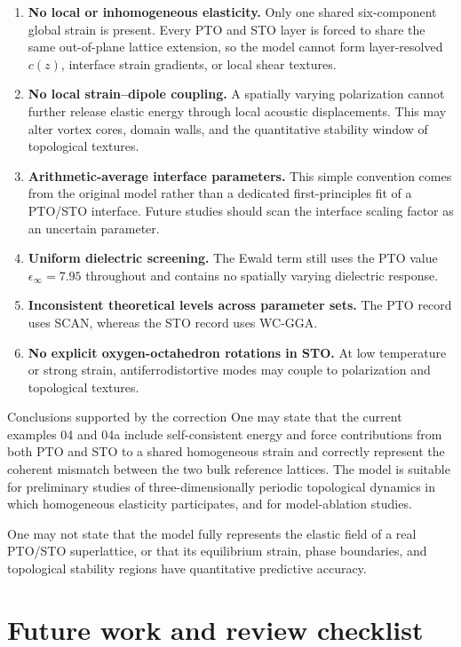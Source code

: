 \documentclass[11pt,a4paper]{article}
\begin{document}
\begin{enumerate}
  \item \textbf{No local or inhomogeneous elasticity.} Only one shared six-component global strain is present. Every PTO and STO layer is forced to share the same out-of-plane lattice extension, so the model cannot form layer-resolved $c(z)$, interface strain gradients, or local shear textures.
  \item \textbf{No local strain--dipole coupling.} A spatially varying polarization cannot further release elastic energy through local acoustic displacements. This may alter vortex cores, domain walls, and the quantitative stability window of topological textures.
  \item \textbf{Arithmetic-average interface parameters.} This simple convention comes from the original model rather than a dedicated first-principles fit of a PTO/STO interface. Future studies should scan the interface scaling factor as an uncertain parameter.
  \item \textbf{Uniform dielectric screening.} The Ewald term still uses the PTO value $\epsilon_\infty=7.95$ throughout and contains no spatially varying dielectric response.
  \item \textbf{Inconsistent theoretical levels across parameter sets.} The PTO record uses SCAN, whereas the STO record uses WC-GGA.
  \item \textbf{No explicit oxygen-octahedron rotations in STO.} At low temperature or strong strain, antiferrodistortive modes may couple to polarization and topological textures.
\end{enumerate}

\begin{resultbox}{Conclusions supported by the correction}
One may state that the current examples 04 and 04a include self-consistent energy and force contributions from both PTO and STO to a shared homogeneous strain and correctly represent the coherent mismatch between the two bulk reference lattices. The model is suitable for preliminary studies of three-dimensionally periodic topological dynamics in which homogeneous elasticity participates, and for model-ablation studies.

One may not state that the model fully represents the elastic field of a real PTO/STO superlattice, or that its equilibrium strain, phase boundaries, and topological stability regions have quantitative predictive accuracy.
\end{resultbox}

\section{Future work and review checklist}
\end{document}
